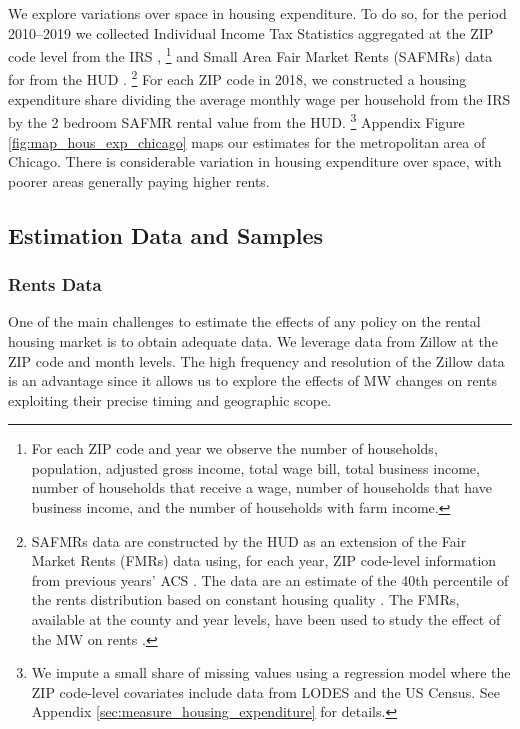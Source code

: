 We explore variations over space in housing expenditure.
To do so, for the period 2010--2019
we collected Individual Income Tax Statistics aggregated at the ZIP code level 
from the IRS \parencite{IRS},%
\footnote{For each ZIP code and year we observe the number of households, 
population, adjusted gross income, total wage bill, total business income, 
number of households that receive a wage, number of households that have 
business income, and the number of households with farm income.}
and Small Area Fair Market Rents (SAFMRs) data for from the HUD 
\parencite{hudSAFMR}.%
\footnote{SAFMRs data are constructed by the HUD as an extension of the
Fair Market Rents (FMRs) data using, for each year, ZIP code-level information
from previous years' ACS \parencite[][, p. 35]{SafmrReport2018}.
The data are an estimate of the 40th percentile of the rents distribution
based on constant housing quality \parencite[][, p. 1]{SafmrReport2018}.
The FMRs, available at the county and year levels, have been used to study the 
effect of the MW on rents \parencite{Tidemann2018, Yamagishi2019}.}
For each ZIP code in 2018, we constructed a housing expenditure share dividing 
the average monthly wage per household from the IRS by the 2 bedroom SAFMR 
rental value from the HUD.%
\footnote{We impute a small share of missing values using a regression model 
where the ZIP code-level covariates include data from LODES and the US Census.
See Appendix \ref{sec:measure_housing_expenditure} for details.}
Appendix Figure \ref{fig:map_hous_exp_chicago} maps our estimates for the 
metropolitan area of Chicago.
There is considerable variation in housing expenditure over space, with poorer
areas generally paying higher rents.

\subsection{Estimation Data and Samples}

\subsubsection{Rents Data}
\label{sec:data_rents}

One of the main challenges to estimate the effects of any policy on the rental
housing market is to obtain adequate data.
We leverage data from Zillow at the ZIP code and month levels.
The high frequency and resolution of the Zillow data is an advantage since it 
allows us to explore the effects of MW changes on rents exploiting their precise
timing and geographic scope. 

